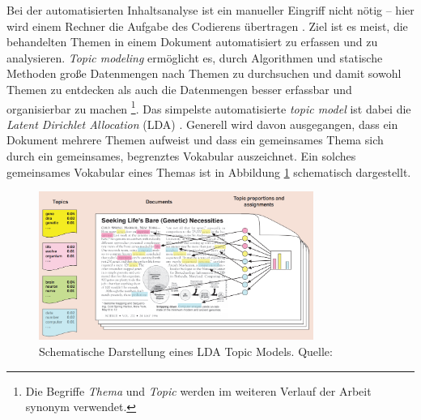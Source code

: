 \documentclass[12pt, 
    twoside=false, 
    bibliography=totoc, 
    numbers=endperiod, 
    headings=normal, 
    toc=chapterentrydotfill
    ]{scrbook}
\begin{document}
Bei der automatisierten Inhaltsanalyse ist ein manueller Eingriff nicht nötig -- hier wird einem Rechner die Aufgabe des Codierens übertragen \parencite[161]{brosius_2012}. Ziel ist es meist, die behandelten Themen in einem Dokument automatisiert zu erfassen \parencite[36f.]{niekler_2018} und zu analysieren. \emph{Topic modeling} ermöglicht es, durch Algorithmen und statische Methoden große Datenmengen nach Themen zu durchsuchen und damit sowohl Themen zu entdecken als auch die Datenmengen besser erfassbar und organisierbar zu machen \parencites[vgl.][77ff.]{blei_2012}[vgl.][163]{brosius_2012}\footnote{Die Begriffe \emph{Thema} und \emph{Topic} werden im weiteren Verlauf der Arbeit synonym verwendet.}. Das simpelste automatisierte \emph{topic model} ist dabei die \emph{Latent Dirichlet Allocation} (LDA) \parencite[78]{blei_2012}. Generell wird davon ausgegangen, dass ein Dokument mehrere Themen aufweist \parencites[78]{blei_2012}[88]{niekler_2018} und dass ein gemeinsames Thema sich durch ein gemeinsames, begrenztes Vokabular auszeichnet.
Ein solches gemeinsames Vokabular eines Themas ist in Abbildung \ref{fig:lda_example} schematisch dargestellt.

\begin{figure}
    \centering
    \includegraphics[width=0.8\textwidth]{images/lda_topic_model.png}
    \caption[Schematische Darstellung eines LDA Topic Models]{Schematische Darstellung eines LDA Topic Models. Quelle:  \parencite{blei_2012}}
    \label{fig:lda_example}
\end{figure}
\end{document}

